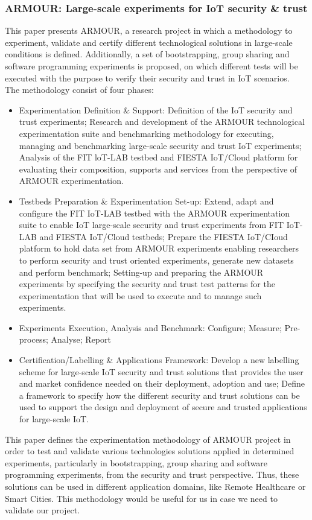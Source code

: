 \subsubsection{ARMOUR: Large-scale experiments for IoT security \& trust}\cite{Paper6}
This paper presents ARMOUR, a research project in which a methodology to experiment, validate and certify different technological solutions in large-scale conditions is defined. Additionally, a set of bootstrapping, group sharing and software programming experiments is proposed, on which different tests will be executed with the purpose to verify their security and trust in IoT scenarios.\\
The methodology consist of four phases:
\begin{itemize}
	\item Experimentation Definition \& Support: Definition of the IoT security and trust experiments; Research and development of the ARMOUR technological experimentation suite and benchmarking methodology for executing, managing and benchmarking large-scale security and trust IoT experiments; Analysis of the FIT loT-LAB testbed and FIESTA IoT/Cloud platform for evaluating their composition, supports and services from the perspective of ARMOUR experimentation.
	
	\item Testbeds Preparation \& Experimentation Set-up: Extend, adapt and configure the FIT IoT-LAB testbed with the ARMOUR experimentation suite to enable IoT large-scale security and trust experiments from FIT IoT-LAB and FIESTA IoT/Cloud testbeds;	Prepare the FIESTA IoT/CIoud platform to hold data set from ARMOUR experiments enabling researchers to perform security and trust oriented experiments, generate new datasets and perform benchmark; Setting-up and preparing the ARMOUR experiments by specifying the security and trust test patterns for the experimentation that will be used to execute and to manage such experiments.
	
	\item Experiments Execution, Analysis and Benchmark: Configure; Measure; Pre-process; Analyse; Report
	
	\item Certification/Labelling \& Applications Framework: Develop a new labelling scheme for large-scale IoT security and trust solutions that provides the user and market confidence needed on their deployment, adoption and use; Define a framework to specify how the different security and trust solutions can be used to support the design and deployment of secure and trusted applications for large-scale IoT.
\end{itemize}
This paper defines the experimentation methodology of ARMOUR project in order to test and validate various technologies solutions applied in determined experiments, particularly in bootstrapping, group sharing and software programming experiments, from the security and trust perspective. Thus, these solutions can be used in different application domains, like Remote Healthcare or Smart Cities.
This methodology would be useful for us in case we need to validate our project.

